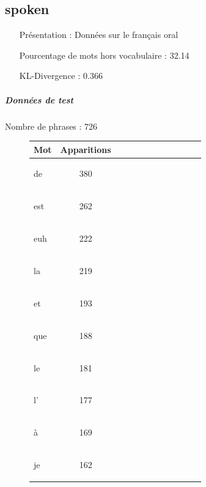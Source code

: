 \clearpage \subsection{spoken } 
 \begin{itemize} 
 \item[Présentation :] Données sur le français oral

 \item[Pourcentage de mots hors vocabulaire : ]32.14
 \item[KL-Divergence :]0.366
 \end{itemize}  \subparagraph{Données de test \\ }  
 Nombre de phrases : 726\\ 
\begin{figure}[H] \begin{minipage}{0.48\textwidth} \centering \begin{tabular}{|l || *{11 }{|c} |} \hline
Mot & Apparitions  \\ \hline
\begin{verb} de \end{verb} &380\\ \hline
\begin{verb} est \end{verb} &262\\ \hline
\begin{verb} euh \end{verb} &222\\ \hline
\begin{verb} la \end{verb} &219\\ \hline
\begin{verb} et \end{verb} &193\\ \hline
\begin{verb} que \end{verb} &188\\ \hline
\begin{verb} le \end{verb} &181\\ \hline
\begin{verb} l' \end{verb} &177\\ \hline
\begin{verb} à \end{verb} &169\\ \hline
\begin{verb} je \end{verb} &162\\ \hline


\end{tabular}
\end{minipage}
\end{figure}
